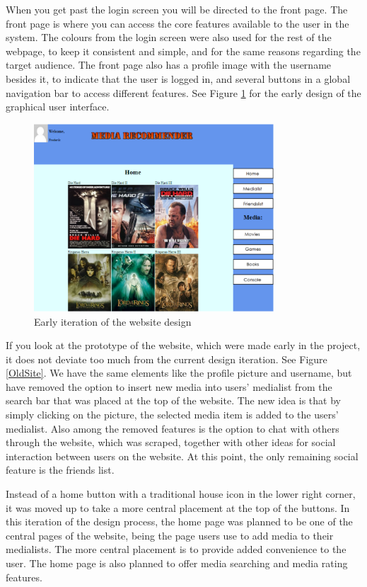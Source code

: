 When you get past the login screen you will be directed to the front page. The front page is where you can access the core features available to the user in the system. The colours from the login screen were also used for the rest of the webpage, to keep it consistent and simple, and for the same reasons regarding the target audience. The front page also has a profile image with the username besides it, to indicate that the user is logged in, and several buttons in a global navigation bar to access different features. See Figure \ref{CurrSite} for the early design of the graphical user interface.

\begin{figure}[htb]
\centering
\includegraphics[width=0.8\textwidth]{Images/CurrSite.png}
\caption{Early iteration of the website design}
\label{CurrSite}
\end{figure}


If you look at the prototype of the website, which were made early in the project, it does not deviate too much from the current design iteration. See Figure \ref{OldSite}. We have the same elements like the profile picture and username, but have removed the option to insert new media into users' medialist from the search bar that was placed at the top of the website. The new idea is that by simply clicking on the picture, the selected media item is added to the users’ medialist. Also among the removed features is the option to chat with others through the website, which was scraped, together with other ideas for social interaction between users on the website. At this point, the only remaining social feature is the friends list. 

Instead of a home button with a traditional house icon in the lower right corner, it was moved up to take a more central placement at the top of the buttons. In this iteration of the design process, the home page was planned to be one of the central pages of the website, being the page users use to add media to their medialists. The more central placement is to provide added convenience to the user. The home page is also planned to offer media searching and media rating features.

